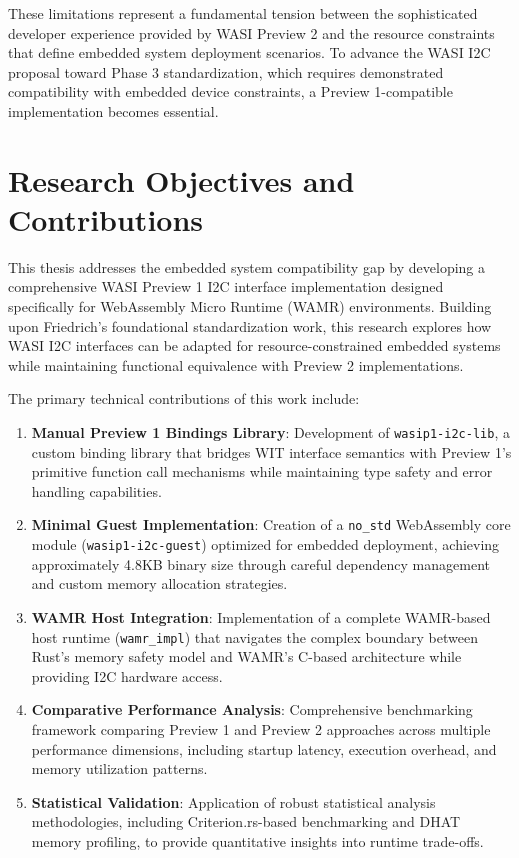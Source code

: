 
These limitations represent a fundamental tension between the sophisticated developer experience provided by WASI Preview 2 and the resource constraints that define embedded system deployment scenarios. To advance the WASI I2C proposal toward Phase 3 standardization, which requires demonstrated compatibility with embedded device constraints, a Preview 1-compatible implementation becomes essential.

\section{Research Objectives and Contributions}
\label{sec:research-objectives}

This thesis addresses the embedded system compatibility gap by developing a comprehensive WASI Preview 1 I2C interface implementation designed specifically for WebAssembly Micro Runtime (WAMR) environments. Building upon Friedrich's foundational standardization work, this research explores how WASI I2C interfaces can be adapted for resource-constrained embedded systems while maintaining functional equivalence with Preview 2 implementations.

The primary technical contributions of this work include:

\begin{enumerate}
    \item \textbf{Manual Preview 1 Bindings Library}: Development of \texttt{wasip1-i2c-lib}, a custom binding library that bridges WIT interface semantics with Preview 1's primitive function call mechanisms while maintaining type safety and error handling capabilities.
    
    \item \textbf{Minimal Guest Implementation}: Creation of a \texttt{no\_std} WebAssembly core module (\texttt{wasip1-i2c-guest}) optimized for embedded deployment, achieving approximately 4.8KB binary size through careful dependency management and custom memory allocation strategies.
    
    \item \textbf{WAMR Host Integration}: Implementation of a complete WAMR-based host runtime (\texttt{wamr\_impl}) that navigates the complex boundary between Rust's memory safety model and WAMR's C-based architecture while providing I2C hardware access.
    
    \item \textbf{Comparative Performance Analysis}: Comprehensive benchmarking framework comparing Preview 1 and Preview 2 approaches across multiple performance dimensions, including startup latency, execution overhead, and memory utilization patterns.
    
    \item \textbf{Statistical Validation}: Application of robust statistical analysis methodologies, including Criterion.rs-based benchmarking and DHAT memory profiling, to provide quantitative insights into runtime trade-offs.
\end{enumerate}

